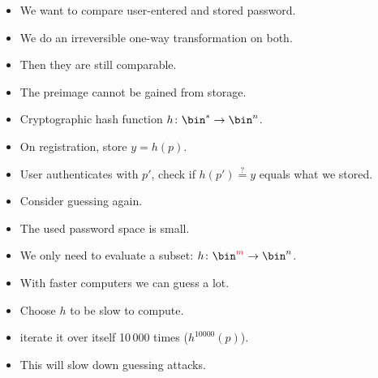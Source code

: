 \begin{frame}
  \begin{idea}
    \begin{itemize}
      \item We want to compare user-entered and stored password.
      \item We do an irreversible one-way transformation on both.
      \item Then they are still comparable.
      \item The preimage cannot be gained from storage.
    \end{itemize}
  \end{idea}

  \pause{}

  \begin{example}
    \begin{itemize}
      \item Cryptographic hash function \(h\colon \bin^*\to \bin^n\).
      \item On registration, store \(y = h(p)\).
      \item User authenticates with \(p'\), check if \(h(p') \stackrel{?}{=}  
        y\) equals what we stored.
    \end{itemize}
  \end{example}
\end{frame}

\begin{frame}
  \begin{remark}
    \begin{itemize}
      \item Consider guessing again.
      \item The used password space is small.
      \item We only need to evaluate a subset: \(h\colon 
          \bin^{\color{red}{m}}\to \bin^n\).
      \item With faster computers we can guess a lot.
    \end{itemize}
  \end{remark}

  \pause

  \begin{solution}
    \begin{itemize}
      \item Choose \(h\) to be slow to compute.
      \item \Eg iterate it over itself 10\,000 times (\(h^{10000}(p)\)).
      \item This will slow down guessing attacks.
    \end{itemize}
  \end{solution}
\end{frame}

